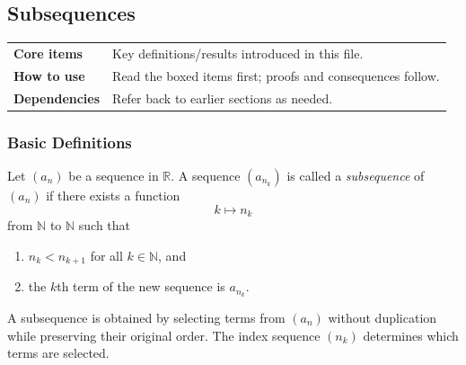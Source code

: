 
\subsection{Subsequences}

\begin{tcolorbox}[colback=gray!6, colframe=gray!40, arc=2pt,
  left=6pt, right=6pt, top=4pt, bottom=4pt,
  title={\small\textbf{Subsequences — Quick Reference}},
  fonttitle=\small\bfseries]
\begin{tabular}{@{}p{}p{}@{}}
\textbf{Core items} & Key definitions/results introduced in this file.\\
\textbf{How to use} & Read the boxed items first; proofs and consequences follow.\\
\textbf{Dependencies} & Refer back to earlier sections as needed.\\
\end{tabular}
\end{tcolorbox}


\subsubsection{Basic Definitions}

\begin{tcolorbox}[colback=propbox, colframe=propborder, arc=2pt,
  left=6pt, right=6pt, top=4pt, bottom=4pt,
  title={\small\textbf{Definition (Subsequence)}},
  fonttitle=\small\bfseries]
Let $(a_n)$ be a sequence in $\mathbb{R}$.
A sequence $(a_{n_k})$ is called a \emph{subsequence} of $(a_n)$ if
there exists a function
\[
k \mapsto n_k
\]
from $\mathbb{N}$ to $\mathbb{N}$ such that
\begin{enumerate}
    \item $n_k < n_{k+1}$ for all $k \in \mathbb{N}$, and
    \item the $k$th term of the new sequence is $a_{n_k}$.
\end{enumerate}
\end{tcolorbox}

\begin{remark}
A subsequence is obtained by selecting terms from $(a_n)$ without duplication
while preserving their original order. The index sequence $(n_k)$ determines
which terms are selected.
\end{remark}

